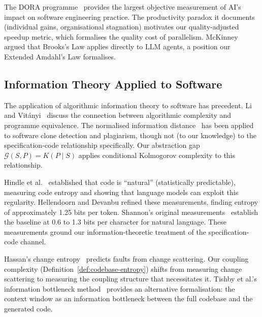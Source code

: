 \documentclass[11pt, a4paper, logo, copyright]{googledeepmind}
\begin{document}
The DORA programme~\citep{dora2025} provides the largest objective measurement of AI's impact on software engineering practice. The productivity paradox it documents (individual gains, organisational stagnation) motivates our quality-adjusted speedup metric, which formalises the quality cost of parallelism. McKinney~\citep{McKinney2026} argued that Brooks's Law applies directly to LLM agents, a position our Extended Amdahl's Law formalises.


\subsection{Information Theory Applied to Software}

The application of algorithmic information theory to software has precedent. Li and Vit\'{a}nyi~\citep{li2019introduction} discuss the connection between algorithmic complexity and programme equivalence. The normalised information distance~\citep{li2004similarity} has been applied to software clone detection and plagiarism, though not (to our knowledge) to the specification-code relationship specifically. Our abstraction gap $\mathcal{G}(S, P) = K(P \mid S)$ applies conditional Kolmogorov complexity to this relationship.

Hindle et al.~\citep{hindle2012naturalness} established that code is ``natural'' (statistically predictable), measuring code entropy and showing that language models can exploit this regularity. Hellendoorn and Devanbu refined these measurements, finding entropy of approximately 1.25 bits per token. Shannon's original measurements~\citep{shannon1948} establish the baseline at 0.6 to 1.3 bits per character for natural language. These measurements ground our information-theoretic treatment of the specification-code channel.

Hassan's change entropy~\citep{hassan2009} predicts faults from change scattering. Our coupling complexity (Definition~\ref{def:codebase-entropy}) shifts from measuring change scattering to measuring the coupling structure that necessitates it. Tishby et al.'s information bottleneck method~\citep{tishby2000information} provides an alternative formalisation: the context window as an information bottleneck between the full codebase and the generated code.
\end{document}

